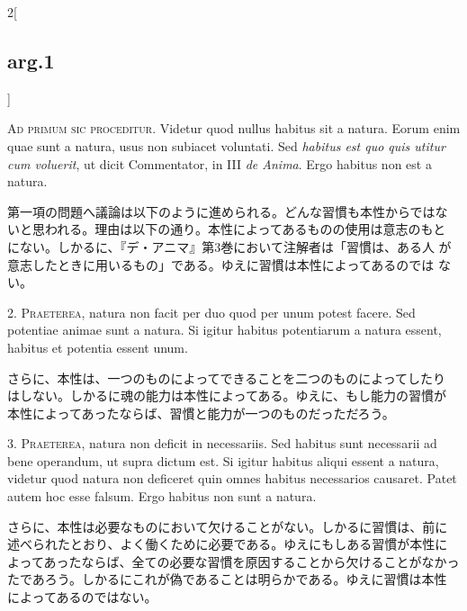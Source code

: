 \documentclass[paper=a4paper,fontsize=10pt,jafontsize=9pt,titlepage]{jlreq}
\begin{document}
\begin{paracol}{2}[\subsection{arg.1}]

{\scshape Ad primum sic proceditur}. Videtur quod nullus habitus sit a
natura. Eorum enim quae sunt a natura, usus non subiacet
voluntati. Sed {\itshape habitus est quo quis utitur cum voluerit}, ut
dicit Commentator, in III {\itshape de Anima}. Ergo habitus non est a
natura.

\switchcolumn

第一項の問題へ議論は以下のように進められる。どんな習慣も本性からではな
いと思われる。理由は以下の通り。本性によってあるものの使用は意志のもと
にない。しかるに、『デ・アニマ』第3巻において注解者は「習慣は、ある人
が意志したときに用いるもの」である。ゆえに習慣は本性によってあるのでは
ない。


2. {\scshape Praeterea}, natura non facit per duo quod per unum potest
facere. Sed potentiae animae sunt a natura. Si igitur habitus
potentiarum a natura essent, habitus et potentia essent unum.

\switchcolumn

さらに、本性は、一つのものによってできることを二つのものによってしたり
はしない。しかるに魂の能力は本性によってある。ゆえに、もし能力の習慣が
本性によってあったならば、習慣と能力が一つのものだっただろう。


3. {\scshape Praeterea}, natura non deficit in necessariis. Sed
habitus sunt necessarii ad bene operandum, ut supra dictum est. Si
igitur habitus aliqui essent a natura, videtur quod natura non
deficeret quin omnes habitus necessarios causaret. Patet autem hoc
esse falsum. Ergo habitus non sunt a natura.

\switchcolumn

さらに、本性は必要なものにおいて欠けることがない。しかるに習慣は、前に
述べられたとおり、よく働くために必要である。ゆえにもしある習慣が本性に
よってあったならば、全ての必要な習慣を原因することから欠けることがなかっ
たであろう。しかるにこれが偽であることは明らかである。ゆえに習慣は本性
によってあるのではない。


\end{paracol}
\end{document}
